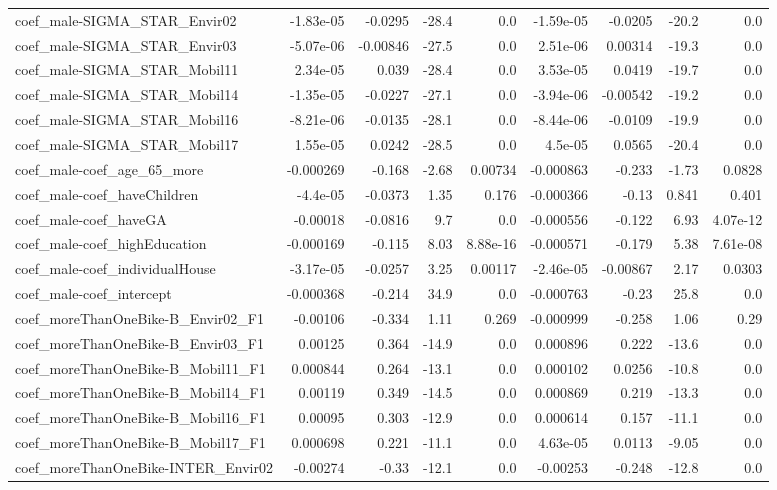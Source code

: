 \begin{tabular}{lrrrrrrrr}
coef_male-SIGMA_STAR_Envir02 & -1.83e-05 & -0.0295 & -28.4 & 0.0 & -1.59e-05 & -0.0205 & -20.2 & 0.0 \\
coef_male-SIGMA_STAR_Envir03 & -5.07e-06 & -0.00846 & -27.5 & 0.0 & 2.51e-06 & 0.00314 & -19.3 & 0.0 \\
coef_male-SIGMA_STAR_Mobil11 & 2.34e-05 & 0.039 & -28.4 & 0.0 & 3.53e-05 & 0.0419 & -19.7 & 0.0 \\
coef_male-SIGMA_STAR_Mobil14 & -1.35e-05 & -0.0227 & -27.1 & 0.0 & -3.94e-06 & -0.00542 & -19.2 & 0.0 \\
coef_male-SIGMA_STAR_Mobil16 & -8.21e-06 & -0.0135 & -28.1 & 0.0 & -8.44e-06 & -0.0109 & -19.9 & 0.0 \\
coef_male-SIGMA_STAR_Mobil17 & 1.55e-05 & 0.0242 & -28.5 & 0.0 & 4.5e-05 & 0.0565 & -20.4 & 0.0 \\
coef_male-coef_age_65_more & -0.000269 & -0.168 & -2.68 & 0.00734 & -0.000863 & -0.233 & -1.73 & 0.0828 \\
coef_male-coef_haveChildren & -4.4e-05 & -0.0373 & 1.35 & 0.176 & -0.000366 & -0.13 & 0.841 & 0.401 \\
coef_male-coef_haveGA & -0.00018 & -0.0816 & 9.7 & 0.0 & -0.000556 & -0.122 & 6.93 & 4.07e-12 \\
coef_male-coef_highEducation & -0.000169 & -0.115 & 8.03 & 8.88e-16 & -0.000571 & -0.179 & 5.38 & 7.61e-08 \\
coef_male-coef_individualHouse & -3.17e-05 & -0.0257 & 3.25 & 0.00117 & -2.46e-05 & -0.00867 & 2.17 & 0.0303 \\
coef_male-coef_intercept & -0.000368 & -0.214 & 34.9 & 0.0 & -0.000763 & -0.23 & 25.8 & 0.0 \\
coef_moreThanOneBike-B_Envir02_F1 & -0.00106 & -0.334 & 1.11 & 0.269 & -0.000999 & -0.258 & 1.06 & 0.29 \\
coef_moreThanOneBike-B_Envir03_F1 & 0.00125 & 0.364 & -14.9 & 0.0 & 0.000896 & 0.222 & -13.6 & 0.0 \\
coef_moreThanOneBike-B_Mobil11_F1 & 0.000844 & 0.264 & -13.1 & 0.0 & 0.000102 & 0.0256 & -10.8 & 0.0 \\
coef_moreThanOneBike-B_Mobil14_F1 & 0.00119 & 0.349 & -14.5 & 0.0 & 0.000869 & 0.219 & -13.3 & 0.0 \\
coef_moreThanOneBike-B_Mobil16_F1 & 0.00095 & 0.303 & -12.9 & 0.0 & 0.000614 & 0.157 & -11.1 & 0.0 \\
coef_moreThanOneBike-B_Mobil17_F1 & 0.000698 & 0.221 & -11.1 & 0.0 & 4.63e-05 & 0.0113 & -9.05 & 0.0 \\
coef_moreThanOneBike-INTER_Envir02 & -0.00274 & -0.33 & -12.1 & 0.0 & -0.00253 & -0.248 & -12.8 & 0.0 \\

\end{tabular}
